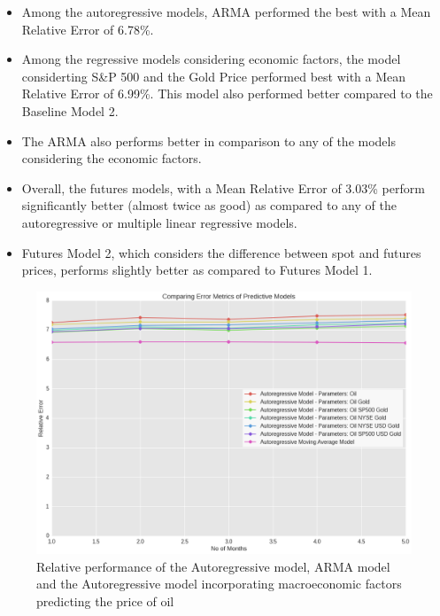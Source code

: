 \documentclass[runningheads]{llncs}
\begin{document}
\begin {itemize}

\item Among the autoregressive models, ARMA performed the best with a Mean Relative Error of 6.78\%. \\
\item Among the regressive models considering economic factors, the model considerting S\&P 500 and the Gold Price performed best with a Mean Relative Error of 6.99\%. This model also performed better compared to the Baseline Model 2. \\
\item The ARMA also performs better in comparison to any of the models considering the economic factors.\\
\item Overall, the futures models, with a Mean Relative Error of 3.03\% perform significantly better (almost twice as good) as compared to any of the autoregressive or multiple linear regressive models. \\
\item Futures Model 2, which considers the difference between spot and futures prices, performs slightly better as compared to Futures Model 1.

\end {itemize}


\begin{figure}
\centering
\includegraphics[width=\textwidth]{ModelComparison_Oil.png}
\caption{Relative performance of the Autoregressive model, ARMA model and the Autoregressive model incorporating macroeconomic factors predicting the price of oil}
\label{fig:ModelComparison_Oil.png}
\end{figure}
\end{document}
